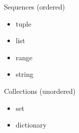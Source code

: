 \documentclass[12pt,c, german, aspectratio=169]{beamer} %
\begin{document}
\begin{frame}[fragile]{}
\begin{minipage}{0.5\linewidth}
  Sequences (ordered)
  \begin{itemize}
      \item tuple
      \item list
      \item range
      \item string
  \end{itemize}
  \end{minipage}
  \begin{minipage}{0.4\linewidth}
  Collections (unordered)
  \begin{itemize}
      \item set
      \item dictionary
  \end{itemize}
  \vspace{2.65em}
  \end{minipage}
  \hfill
\end{frame}
\end{document}
